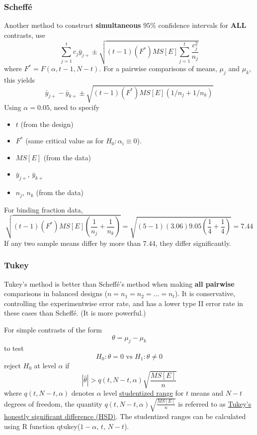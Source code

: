 \subsubsection*{Scheff\'e}
Another method to construct {\bf simultaneous} $95\%$ confidence intervals for {\bf ALL} contrasts, use
$$
\sum\limits_{j = 1}^t c_j \bar{y}_{j+} \pm \sqrt{(t - 1)(F^*)MS[E]\sum\limits_{j = 1}^t \frac{c_j^2}{n_j}}
$$
where $F^* = F(\alpha, t - 1, N - t)$.  For a pairwise comparisons of means, $\mu_j$ and $\mu_k$, this yields
$$
\bar{y}_{j+} - \bar{y}_{k+} \pm \sqrt{(t - 1)(F^*)MS[E](1 / n_j + 1 / n_k)}
$$
Using $\alpha = 0.05$, need to specify
\begin{itemize}
	\item $t$ (from the design)
	\item $F^*$ (same critical value as for $H_0: \alpha_i \equiv 0$).
	\item $MS[E]$ (from the data)
	\item $\bar{y}_{j+}$, $\bar{y}_{k+}$
	\item $n_j$, $n_k$ (from the data)
\end{itemize}
For binding fraction data,
$$
\sqrt{(t - 1)(F^*)MS[E](\frac{1}{n_j} + \frac{1}{n_k})} = \sqrt{(5 - 1)(3.06)9.05(\frac{1}{4} + \frac{1}{4})} = 7.44
$$
If any two sample means differ by more than $7.44$, they differ significantly.

\subsubsection*{Tukey}
Tukey's method is better than Scheff\'e's method when making {\bf all pairwise} comparisons in balanced designs ($n = n_1 = n_2 = \dots =n_t$).
It is conservative, controlling the experimentwise error rate, and has a lower type II error rate in these cases than Scheff\'e.  (It is more powerful.)

For simple contrasts of the form
$$
\theta = \mu_j - \mu_k
$$
to test
$$
H_0: \theta = 0 \mbox{ vs } H_1: \theta \ne 0
$$
reject $H_0$ at level $\alpha$ if
$$
|\hat{\theta}| > q(t, N-t, \alpha)\sqrt{\frac{MS[E]}{n}}
$$
where $q(t, N-t, \alpha)$ denotes $\alpha$ level \underline{studentized range} for $t$ means and $N-t$ degrees of freedom,
the quantity $q(t, N-t, \alpha)\sqrt{\frac{MS[E]}{n}}$ is referred to as \underline{Tukey's honestly significant difference (HSD)}.
The studentized ranges can be calculated using R function \colorbox{shadecolor}{qtukey($1 - \alpha$, $t$, $N-t$)}. 












